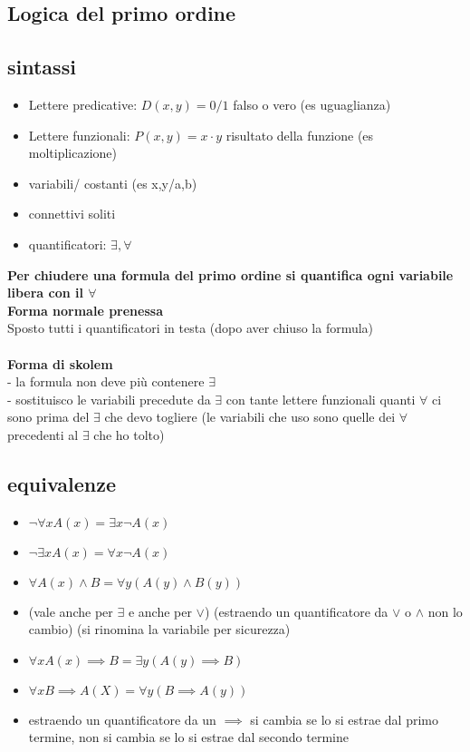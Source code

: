 \documentclass{article}
\begin{document}
\begin{multicols*}{3}
 	 	\section{Logica del primo ordine}
 	 	
 		\subsection{sintassi}
 		\begin{itemize}
 			\setlength\itemsep{0.1mm}
 			\item Lettere predicative: \(D(x,y) = 0/1\) falso o vero (es uguaglianza)
 			\item Lettere funzionali: \(P(x,y) = x\cdot y\) risultato della funzione (es moltiplicazione)
 			\item variabili/ costanti (es x,y/a,b)
 			\item connettivi soliti
 			\item quantificatori: \(\exists, \forall\)
 		\end{itemize}
 		\textbf{Per chiudere una formula del primo ordine si quantifica ogni variabile libera con il \(\forall\)}\\
 		\textbf{Forma normale prenessa}\\
 		Sposto tutti i quantificatori in testa (dopo aver chiuso la formula)\\\\
 		\textbf{Forma di skolem}\\
 		- la formula non deve più contenere \(\exists\)\\
 		- sostituisco le variabili precedute da \(\exists\) con tante lettere funzionali quanti \(\forall\) ci sono prima del \(\exists\) che devo togliere (le variabili che uso sono quelle dei \(\forall\) precedenti al \(\exists\) che ho tolto)\\
 		\subsection{equivalenze}
 		\begin{itemize}
 			\setlength\itemsep{0.1mm}
 			\item \(\neg \forall x A(x) = \exists x\neg A(x)\)
 			\item \(\neg \exists x A(x) = \forall x\neg A(x)\)
 			\item \(\forall A(x) \land B = \forall y (A(y) \land B(y))\) 
 			\item (vale anche per \(\exists\) e anche per \(\lor\)) (estraendo un quantificatore da \(\lor\) o \(\land\) non lo cambio) (si rinomina la variabile per sicurezza)
 			\item \(\forall x A(x) \implies B = \exists y (A(y) \implies B)\)
 			\item \(\forall x B \implies A(X) = \forall y (B \implies A(y))\) 
 			\item estraendo un quantificatore da un \(\implies\) si cambia se lo si estrae dal primo termine, non si cambia se lo si estrae dal secondo termine
 		\end{itemize}

\end{multicols*}
\end{document}
